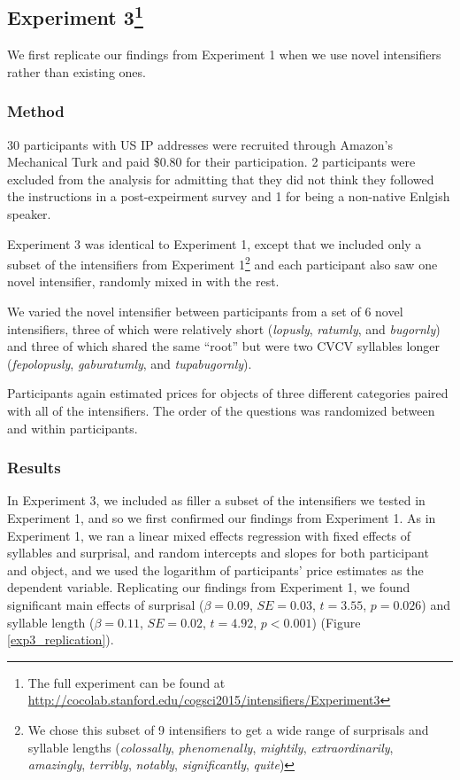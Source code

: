 \documentclass[10pt,letterpaper]{article}
\newcommand{\w}[1]{\emph{#1}}
\begin{document}
\subsection{Experiment 3\footnote{The full experiment can be found at \url{http://cocolab.stanford.edu/cogsci2015/intensifiers/Experiment3}}}

We first replicate our findings from Experiment 1 when we use novel intensifiers rather than existing ones.

\subsubsection{Method}
30 participants with US IP addresses were recruited through Amazon's Mechanical Turk and paid \$0.80 for their participation. 2 participants were excluded from the analysis for admitting that they did not think they followed the instructions in a post-expeirment survey and 1 for being a non-native Enlgish speaker.

Experiment 3 was identical to Experiment 1, except that we included only a subset of the intensifiers from Experiment 1\footnote{
  We chose this subset of 9 intensifiers to get a wide range of surprisals and syllable lengths (\w{colossally}, \w{phenomenally}, \w{mightily}, \w{extraordinarily}, \w{amazingly}, \w{terribly}, \w{notably}, \w{significantly}, \w{quite})
}
and each participant also saw one novel intensifier, randomly mixed in with the rest.

We varied the novel intensifier between participants from a set of 6 novel intensifiers, three of which were relatively short (\w{lopusly}, \w{ratumly}, and \w{bugornly}) and three of which shared the same ``root'' but were two CVCV syllables longer (\w{fepolopusly}, \w{gaburatumly}, and \w{tupabugornly}).

Participants again estimated prices for objects of three different categories paired with all of the intensifiers. The order of the questions was randomized between and within participants.

\subsubsection{Results}
In Experiment 3, we included as filler a subset of the intensifiers we tested in Experiment 1, and so we first confirmed our findings from Experiment 1. As in Experiment 1, we ran a linear mixed effects regression with fixed effects of syllables and surprisal, and random intercepts and slopes for both participant and object, and we used the logarithm of participants' price estimates as the dependent variable. Replicating our findings from Experiment 1, we found significant main effects of surprisal ($\beta=0.09$, $SE=0.03$, $t=3.55$, $p=0.026$) and syllable length ($\beta=0.11$, $SE=0.02$, $t=4.92$, $p<0.001$) (Figure \ref{exp3_replication}).
\end{document}
